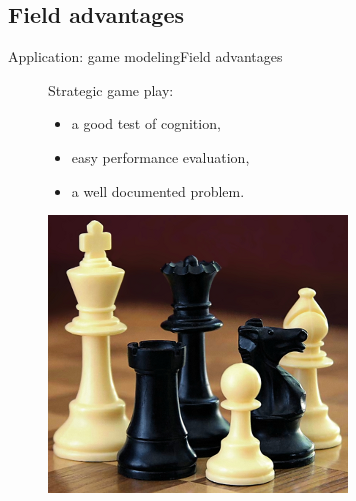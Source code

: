 \subsection{Field advantages}
\begin{frame}{Application: game modeling}{Field advantages}

\begin{figure}[ht]
\begin{minipage}[t]{0.5\linewidth}
\vspace{0pt}
Strategic game play:
\begin{itemize}
\item a good test of cognition,
\item easy performance evaluation,
\item a well documented problem.
\end{itemize}
\end{minipage}
\hfill
\begin{minipage}[t]{0.4\linewidth}
\vspace{0pt}
\centering
\includegraphics[width=\textwidth]{img/application/chess.png}
\end{minipage}
\end{figure}

\end{frame}

